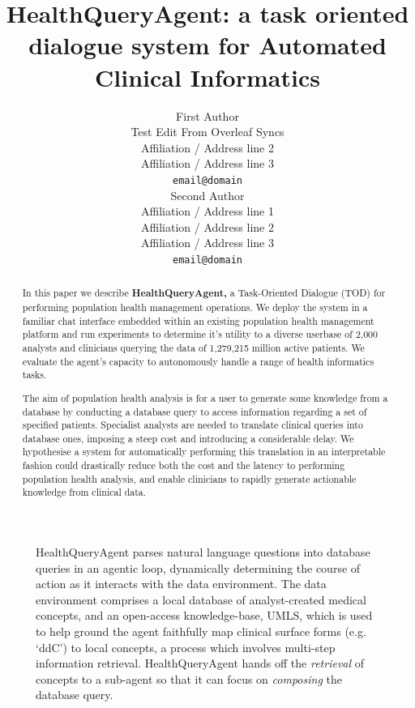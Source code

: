 \documentclass[11pt]{article}
\title{HealthQueryAgent: a task oriented dialogue system for Automated Clinical Informatics}
\author{First Author \\
  Test Edit From Overleaf Syncs \\
  Affiliation / Address line 2 \\
  Affiliation / Address line 3 \\
  \texttt{email@domain} \\\And
  Second Author \\
  Affiliation / Address line 1 \\
  Affiliation / Address line 2 \\
  Affiliation / Address line 3 \\
  \texttt{email@domain} \\}
\begin{document}


\maketitle
\begin{abstract}
In this paper we describe \textbf{HealthQueryAgent,} a Task-Oriented Dialogue (TOD) for performing population health management operations. We deploy the system in a familiar chat interface embedded within an existing population health management platform and run experiments to determine it's utility to a diverse userbase of 2,000 analysts and clinicians querying the data of 1,279,215 million active patients. We evaluate the agent's capacity to autonomously handle a range of health informatics tasks.

The aim of population health analysis is for a user to generate some knowledge from a database by conducting a database query to access information regarding a set of specified patients. 
Specialist analysts are needed to translate clinical queries into database ones, imposing a steep cost and introducing a considerable delay. We hypothesise a system for automatically performing this translation in an interpretable fashion could drastically reduce both the cost and the latency to performing population health analysis, and enable clinicians to rapidly generate actionable knowledge from clinical data.

\end{abstract}

\begin{figure}[htbp]
\centering

\caption{
HealthQueryAgent parses natural language questions into database queries in an agentic loop, dynamically determining the course of action as it interacts with the data environment.
The data environment comprises a local database of analyst-created medical concepts, and an open-access knowledge-base, UMLS, which is used to help ground the agent faithfully map clinical surface forms (e.g. `ddC') to local concepts, a process which involves multi-step information retrieval.
HealthQueryAgent hands off the \textit{retrieval} of concepts to a sub-agent so that it can focus on \textit{composing} the database query.}
\label{fig:question-to-query}

\end{figure}
\end{document}
